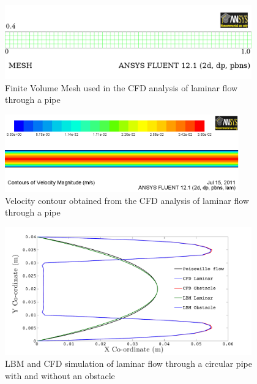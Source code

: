 \begin{figure}[h]
\centering
\includegraphics[width=0.95\textwidth]{CFD_Mesh}
\caption{Finite Volume Mesh used in the CFD analysis of laminar flow through a 
pipe}
\label{fig:mesh}
\end{figure}


\begin{figure}[h]
\centering
\includegraphics[width=0.9\textwidth]{CFD_Poiseuille}
\caption{Velocity contour obtained from the CFD analysis of laminar flow 
through a pipe}
\label{fig:cont}
\end{figure}


\begin{figure}[h]
\centering
\includegraphics[width=0.95\textwidth]{LBMCFD}
\caption{LBM and CFD simulation of laminar flow through a circular pipe with 
and without an obstacle}
\label{fig:LBM}
\end{figure}

